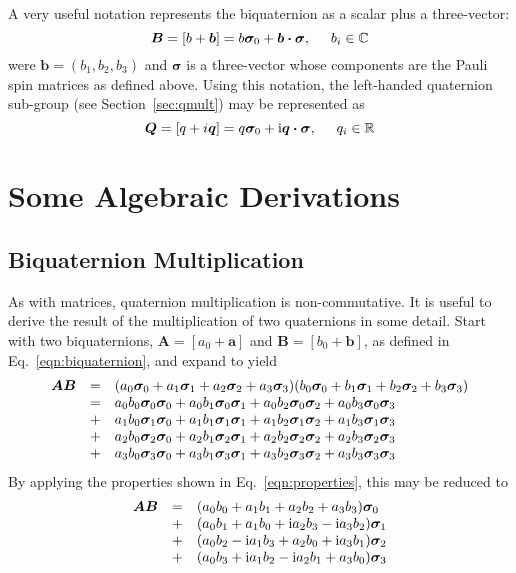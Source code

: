 \documentclass[12pt]{article}
\newcommand{\Ci}{{\rm i}}
\newcommand{\C}{\mathbb{C}}
\newcommand{\R}{\mathbb{R}}
\newcommand{\pauli}[1]{\ensuremath{ {\bm\sigma}_{\rm #1} }}
\begin{document}
A very useful notation represents the biquaternion as a scalar plus
a three-vector:
\begin{equation}\label{eqn:biquaternion}
\bm{B}=[b+\bm{b}] = b\pauli{0} + \bm{b\cdot\sigma}, \hspace{5mm} b_i\in\C
\end{equation}
were $\bm{b}=(b_1,b_2,b_3)$ and $\bm\sigma$ is a three-vector whose
components are the Pauli spin matrices as defined above.  Using this
notation, the left-handed quaternion sub-group (see
Section~\ref{sec:qmult}) may be represented as
\begin{equation}\label{eqn:quaternion}
\bm{Q}=[q+i\bm{q}]= q\pauli{0} + \Ci\bm{q\cdot\sigma}, \hspace{5mm} q_i\in\R
\end{equation}

\section{Some Algebraic Derivations}

\subsection{Biquaternion Multiplication}
As with matrices, quaternion multiplication is non-commutative.  It is
useful to derive the result of the multiplication of two quaternions
in some detail. Start with two biquaternions, $\bm{A}=[a_0+\bm{a}]$
and $\bm{B}=[b_0+\bm{b}]$, as defined in Eq.~\ref{eqn:biquaternion},
and expand to yield
\begin{eqnarray}
\begin{array}{ccl}
\bm{A}\bm{B} & = &
(a_0\pauli{0} + a_1\pauli{1} + a_2\pauli{2} + a_3\pauli{3})
(b_0\pauli{0} + b_1\pauli{1} + b_2\pauli{2} + b_3\pauli{3}) \\
& = & a_0b_0\pauli{0}\pauli{0} + a_0b_1\pauli{0}\pauli{1}
	+ a_0b_2\pauli{0}\pauli{2} + a_0b_3\pauli{0}\pauli{3} \\
& + & a_1b_0\pauli{1}\pauli{0} + a_1b_1\pauli{1}\pauli{1}
	+ a_1b_2\pauli{1}\pauli{2} + a_1b_3\pauli{1}\pauli{3} \\
& + & a_2b_0\pauli{2}\pauli{0} + a_2b_1\pauli{2}\pauli{1}
	+ a_2b_2\pauli{2}\pauli{2} + a_2b_3\pauli{2}\pauli{3} \\
& + & a_3b_0\pauli{3}\pauli{0} + a_3b_1\pauli{3}\pauli{1}
	+ a_3b_2\pauli{3}\pauli{2} + a_3b_3\pauli{3}\pauli{3}
\end{array}
\end{eqnarray}
By applying the properties shown in Eq.~\ref{eqn:properties}, this may
be reduced to
\begin{eqnarray}\label{eqn:biquaternion_multiplication}
\begin{array}{ccl}
\bm{A}\bm{B}
& = & (a_0b_0 + a_1b_1 + a_2b_2 + a_3b_3) \pauli{0} \\
& + & (a_0b_1 + a_1b_0 + \Ci a_2b_3 - \Ci a_3b_2) \pauli{1} \\
& + & (a_0b_2 - \Ci a_1b_3 + a_2b_0 + \Ci a_3b_1) \pauli{2} \\
& + & (a_0b_3 + \Ci a_1b_2 - \Ci a_2b_1 + a_3b_0) \pauli{3}	
\end{array}
\end{eqnarray}
\end{document}
